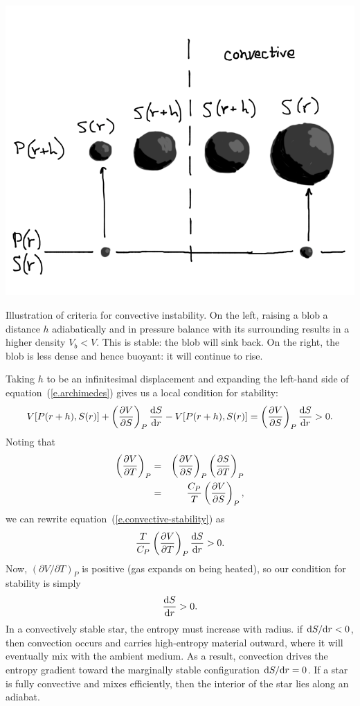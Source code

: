 \begin{marginfigure}
\includegraphics[width=\textwidth]{convective.png}
\caption[Illustration of criteria for convective instability.]{\label{f.convective-schematic}Illustration of criteria for convective instability.  On the left, raising a blob a distance $h$ adiabatically and in pressure balance with its surrounding results in a higher density $V_{b} < V$.  This is stable: the blob will sink back.  On the right, the blob is less dense and hence buoyant: it will continue to rise.}
\end{marginfigure}

Taking $h$ to be an infinitesimal displacement and expanding the left-hand side of equation~(\ref{e.archimedes}) gives us a local condition for stability:
\begin{equation}\label{e.convective-stability}
V[P(r+h),S(r)] + \left(\frac{\partial V}{\partial S}\right)_{P}\frac{\mathrm{d} S}{\mathrm{d} r} - V[P(r+h),S(r)]  = \left(\frac{\partial V}{\partial S}\right)_{P}\frac{\mathrm{d} S}{\mathrm{d} r} > 0 .
\end{equation}
Noting that
\begin{eqnarray*}
\left(\frac{\partial V}{\partial T}\right)_{P} &=& \left(\frac{\partial V}{\partial S}\right)_{P}\left(\frac{\partial S}{\partial T}\right)_{P}\\
 &=& \frac{C_{P}}{T}\left(\frac{\partial V}{\partial S}\right)_{P},
 \end{eqnarray*}
 we can rewrite equation~(\ref{e.convective-stability}) as
 \[
 \frac{T}{C_{P}}\left(\frac{\partial V}{\partial T}\right)_{P}\frac{\mathrm{d} S}{\mathrm{d} r} > 0.
 \]
Now, $(\partial V/\partial T)_{P}$ is positive (gas expands on being heated), so our condition for stability is simply
 \begin{equation}\label{e.entropy-condition}
\frac{\mathrm{d} S}{\mathrm{d} r} > 0.
\end{equation}
In a convectively stable star, the entropy must increase with radius. if $\mathrm{d} S/\mathrm{d} r < 0$, then convection occurs and carries high-entropy material outward, where it will eventually mix with the ambient medium.  As a result, convection drives the entropy gradient toward the marginally stable configuration $\mathrm{d} S/\mathrm{d} r = 0$.  If a star is fully convective and mixes efficiently, then the interior of the star lies along an adiabat. 

